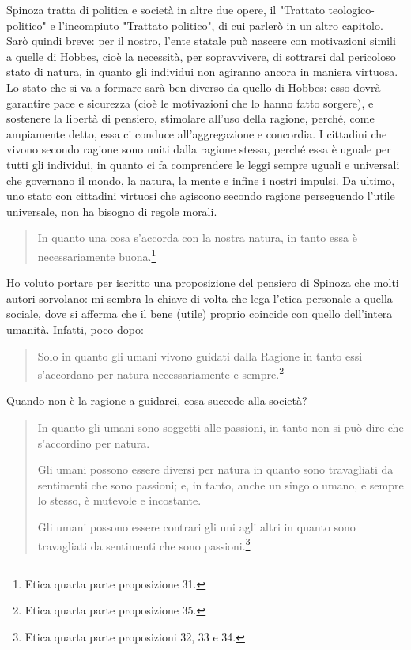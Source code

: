 Spinoza tratta di politica e società in altre due opere, il "Trattato teologico-politico" e l'incompiuto "Trattato politico", di cui parlerò in un altro capitolo. Sarò quindi breve: per il nostro, l'ente statale può nascere con motivazioni simili a quelle di Hobbes, cioè la necessità, per sopravvivere, di sottrarsi dal pericoloso stato di natura, in quanto gli individui non agiranno ancora in maniera virtuosa. Lo stato che si va a formare sarà ben diverso da quello di Hobbes: esso dovrà garantire pace e sicurezza (cioè le motivazioni che lo hanno fatto sorgere), e sostenere la libertà di pensiero, stimolare all'uso della ragione, perché, come ampiamente detto, essa ci conduce all'aggregazione e concordia. I cittadini che vivono secondo ragione sono uniti dalla ragione stessa, perché essa è uguale per tutti gli individui, in quanto ci fa comprendere le leggi sempre uguali e universali che governano il mondo, la natura, la mente e infine i nostri impulsi. Da ultimo, uno stato con cittadini virtuosi che agiscono secondo ragione perseguendo l'utile universale, non ha bisogno di regole morali.

\begin{quotation}
	\small In quanto una cosa s’accorda con la nostra natura, in tanto essa è necessariamente buona.\footnote{Etica quarta parte proposizione 31.}
\end{quotation}

Ho voluto portare per iscritto una proposizione del pensiero di Spinoza che molti autori sorvolano: mi sembra la chiave di volta che lega l'etica personale a quella sociale, dove si afferma che il bene (utile) proprio coincide con quello dell'intera umanità. Infatti, poco dopo:

\begin{quotation}
	\small Solo in quanto gli umani vivono guidati dalla Ragione in tanto essi s’accordano per natura necessariamente e sempre.\footnote{Etica quarta parte proposizione 35.}
\end{quotation}

Quando non è la ragione a guidarci, cosa succede alla società?

\begin{quotation}
	\small In quanto gli umani sono soggetti alle passioni, in tanto non si può dire che s’accordino
	per natura.
	
	Gli umani possono essere diversi per natura in quanto sono travagliati da sentimenti che
	sono passioni; e, in tanto, anche un singolo umano, e sempre lo stesso, è mutevole e incostante.
	
	Gli umani possono essere contrari gli uni agli altri in quanto sono travagliati da sentimenti che sono passioni.\footnote{Etica quarta parte proposizioni 32, 33 e 34.}
\end{quotation}

